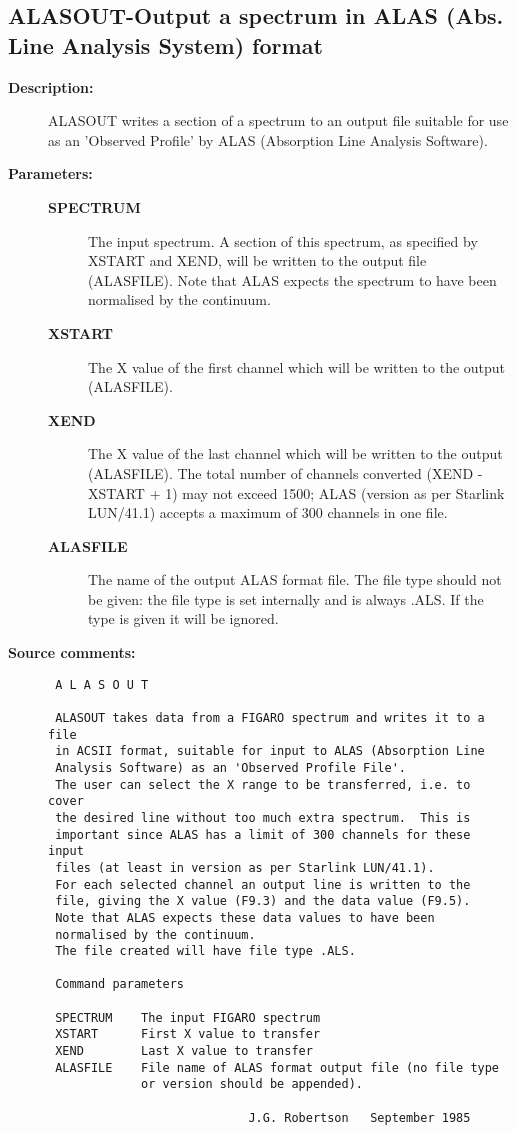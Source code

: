 \subsection{ALASOUT-\label{ALASOUT}Output a spectrum in ALAS (Abs. Line Analysis System) format}
\begin{description}

\item [{\bf Description:}]
 ALASOUT  writes a section of a spectrum to an output file suitable for
 use as an 'Observed Profile' by ALAS (Absorption Line Analysis Software).

\item [{\bf Parameters:}]
\begin{description}
\item [{\bf SPECTRUM}]
 The input spectrum.  A section of this spectrum, as specified by XSTART
 and XEND, will be written to the output file (ALASFILE).  Note that ALAS
 expects the spectrum to have been normalised by the continuum.
\item [{\bf XSTART}]
 The X value of the first channel which will be written to the output
 (ALASFILE).
\item [{\bf XEND}]
 The X value of the last channel which will be written to the output
 (ALASFILE).  The total number of channels converted (XEND - XSTART + 1)
 may not exceed 1500; ALAS (version as per Starlink LUN/41.1) accepts a
 maximum of 300 channels in one file.
\item [{\bf ALASFILE}]
 The name of the output ALAS format file.  The file type should not be
 given: the file type is set internally and is always .ALS.  If the type
 is given it will be ignored.
\end{description}

\item [{\bf Source comments:}]
\begin{verbatim}
 A L A S O U T

 ALASOUT takes data from a FIGARO spectrum and writes it to a file
 in ACSII format, suitable for input to ALAS (Absorption Line
 Analysis Software) as an 'Observed Profile File'.
 The user can select the X range to be transferred, i.e. to cover
 the desired line without too much extra spectrum.  This is
 important since ALAS has a limit of 300 channels for these input
 files (at least in version as per Starlink LUN/41.1).
 For each selected channel an output line is written to the
 file, giving the X value (F9.3) and the data value (F9.5).
 Note that ALAS expects these data values to have been
 normalised by the continuum.
 The file created will have file type .ALS.

 Command parameters

 SPECTRUM    The input FIGARO spectrum
 XSTART      First X value to transfer
 XEND        Last X value to transfer
 ALASFILE    File name of ALAS format output file (no file type
             or version should be appended).

                            J.G. Robertson   September 1985
\end{verbatim}
\end{description}
